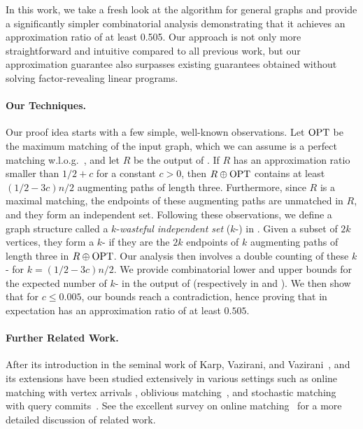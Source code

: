 In this work, we take a fresh look at the \rnk{} algorithm for general graphs and provide a significantly simpler combinatorial analysis demonstrating that it achieves an approximation ratio of at least 0.505. Our approach is not only more straightforward and intuitive compared to all previous work, but our approximation guarantee also surpasses existing guarantees obtained without solving factor-revealing linear programs.


 


\paragraph{Our Techniques.} Our proof idea starts with a few simple, well-known observations. Let $\text{OPT}$ be the maximum matching of the input graph, which we can assume is a perfect matching w.l.o.g.~\cite{poloczek2012randomized}, and let $R$ be the output of \rnk{}. If $R$ has an approximation ratio smaller than $1/2+c$ for a constant $c>0$, then $R\oplus \text{OPT}$ contains at least $(1/2-3c)n/2$ augmenting paths of length three. Furthermore, since $R$ is a maximal matching, the endpoints of these augmenting paths are unmatched in $R$, and they form an independent set. Following these observations, we define a graph structure called a $k$-{\em wasteful independent set} ($k$-\wis{}) in . Given a subset of $2k$ vertices, they form a $k$-\wis{} if they are the $2k$ endpoints of $k$ augmenting paths of length three in $R\oplus \text{OPT}$. Our analysis then involves a double counting of these $k$-\wis{} for $k=(1/2-3c)n/2$. We provide combinatorial lower and upper bounds for the expected number of $k$-\wis{} in the output of \rnk{} (respectively in  and ). We then show that for $c\leq 0.005$, our bounds reach a contradiction, hence proving that \rnk{} in expectation has an approximation ratio of at least $0.505$.

\paragraph{Further Related Work.} After its introduction in the seminal work of Karp, Vazirani, and Vazirani~\cite{karp1990optimal}, \rnk{} and its extensions have been studied extensively in various settings such as online matching with vertex arrivals \cite{DBLP:conf/sosa/EdenFFS21, DBLP:conf/soda/GoelM08, DBLP:journals/sigact/BirnbaumM08, DBLP:conf/soda/DevanurJK13, DBLP:journals/jacm/HuangKTWZZ20, DBLP:conf/soda/0002PTTWZ19, DBLP:conf/focs/0002T0020,0.546ranking}, oblivious matching~\cite{DBLP:conf/stoc/MahdianY11, DBLP:conf/stoc/TangW020, chan2014ranking}, and stochastic matching with query commits~\cite{DBLP:conf/soda/GamlathKS19, DBLP:conf/soda/Derakhshan023}. See the excellent survey  on online matching~\cite{huang2024online} for a more detailed discussion of related work. 




